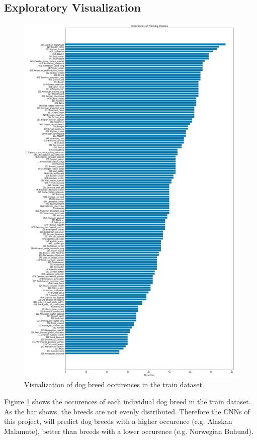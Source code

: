 \documentclass{article}
\begin{document}
\subsection{Exploratory Visualization} \label{su_expl_vis}
\begin{figure}[H]
    \centering
    \includegraphics[scale=0.35]{./images/dog_breed_occurence}
    \caption{Visualization of dog breed occurences in the train dataset.}
    \label{fig:breed_occurence}
\end{figure}
Figure \ref{fig:breed_occurence} shows the occurences of each individual dog breed in the train dataset. As the bar shows, the breeds are not evenly distributed. Therefore the CNNs of this project, will predict dog breeds with a higher occurence (e.g. Alaskan Malamute), better than breeds with a lower occurence (e.g. Norwegian Buhund).
\end{document}
